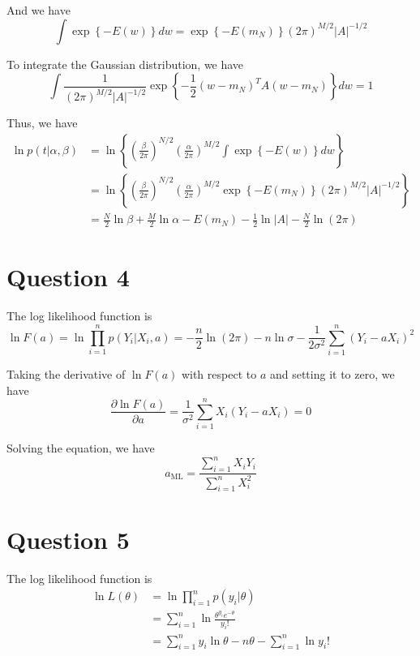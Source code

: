 \documentclass[a4paper,12pt]{article}
\newcommand{\pard}[2]{\frac{\partial #1}{\partial #2}}
\begin{document}
And we have
\begin{equation*}
	\int \exp \left\{ -E(w) \right\} dw = \exp \left\{ -E(m_N) \right\} (2\pi)^{M/2} |A|^{-1/2}
\end{equation*}

To integrate the Gaussian distribution, we have
\begin{equation*}
	\int \frac{1}{(2\pi)^{M/2} |A|^{-1/2}} \exp \left\{ -\frac{1}{2} (w - m_N)^T A (w - m_N) \right\} dw = 1
\end{equation*}

Thus, we have
\begin{align*}
	\ln p(t | \alpha, \beta) &= \ln \left\{ (\frac{\beta}{2\pi})^{N/2} (\frac{\alpha}{2\pi})^{M/2} \int \exp \left\{ -E(w) \right\} dw \right\} \\
	&= \ln \left\{ (\frac{\beta}{2\pi})^{N/2} (\frac{\alpha}{2\pi})^{M/2} \exp \left\{ -E(m_N) \right\} (2\pi)^{M/2} |A|^{-1/2} \right\} \\
	&= \frac{N}{2} \ln \beta + \frac{M}{2} \ln \alpha - E(m_N) - \frac{1}{2} \ln |A| - \frac{N}{2} \ln (2\pi) 
\end{align*}

\section*{Question 4}

The log likelihood function is
\begin{equation*}
	\ln F(a) = \ln \prod_{i=1}^{n} p(Y_i | X_i, a) = -\frac{n}{2} \ln (2\pi) - n \ln \sigma - \frac{1}{2\sigma^2} \sum_{i=1}^{n} (Y_i - a X_i)^2
\end{equation*}

Taking the derivative of $\ln F(a)$ with respect to $a$ and setting it to zero, we have
\begin{equation*}
	\pard{\ln F(a)}{a} = \frac{1}{\sigma^2} \sum_{i=1}^{n} X_i (Y_i - a X_i) = 0
\end{equation*}

Solving the equation, we have
\begin{equation*}
	a_{\text{ML}} = \frac{\sum_{i=1}^{n} X_i Y_i}{\sum_{i=1}^{n} X_i^2}
\end{equation*}

\section*{Question 5}

The log likelihood function is
\begin{align*}
	\ln L(\theta) &= \ln \prod_{i=1}^{n} p(y_i | \theta) \\
	&= \sum_{i=1}^{n} \ln \frac{\theta^{y_i} e^{-\theta}}{y_i!} \\
	&= \sum_{i=1}^{n} y_i \ln \theta - n \theta - \sum_{i=1}^{n} \ln y_i!
\end{align*}
\end{document}
